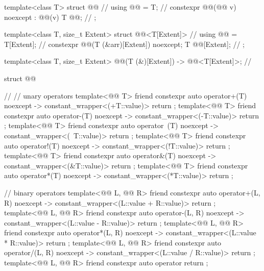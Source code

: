 \begin{codeblock}
template<class T>
struct @@ {                                                         // \expos
  using @@ = T;                                                               // \expos
  constexpr @@(@@ v) noexcept : @@(v) {}
  T @@;                                                                       // \expos
};

template<class T, size_t Extent>
struct @@<T[Extent]> {                                              // \expos
  using @@ = T[Extent];                                                       // \expos
  constexpr @@(T (&arr)[Extent]) noexcept;
  T @@[Extent];                                                               // \expos
};

template<class T, size_t Extent>
  @@(T (&)[Extent]) -> @@<T[Extent]>;                   // \expos

struct @@ {                                                           // \expos
  // unary operators
  template<@@ T>
    friend constexpr auto operator+(T) noexcept -> constant_wrapper<(+T::value)>
      { return {}; }
  template<@@ T>
    friend constexpr auto operator-(T) noexcept -> constant_wrapper<(-T::value)>
      { return {}; }
  template<@@ T>
    friend constexpr auto operator~(T) noexcept -> constant_wrapper<(~T::value)>
      { return {}; }
  template<@@ T>
    friend constexpr auto operator!(T) noexcept -> constant_wrapper<(!T::value)>
      { return {}; }
  template<@@ T>
    friend constexpr auto operator&(T) noexcept -> constant_wrapper<(&T::value)>
      { return {}; }
  template<@@ T>
    friend constexpr auto operator*(T) noexcept -> constant_wrapper<(*T::value)>
      { return {}; }

  // binary operators
  template<@@ L, @@ R>
    friend constexpr auto operator+(L, R) noexcept -> constant_wrapper<(L::value + R::value)>
      { return {}; }
  template<@@ L, @@ R>
    friend constexpr auto operator-(L, R) noexcept -> constant_wrapper<(L::value - R::value)>
      { return {}; }
  template<@@ L, @@ R>
    friend constexpr auto operator*(L, R) noexcept -> constant_wrapper<(L::value * R::value)>
      { return {}; }
  template<@@ L, @@ R>
    friend constexpr auto operator/(L, R) noexcept -> constant_wrapper<(L::value / R::value)>
      { return {}; }
  template<@@ L, @@ R>
    friend constexpr auto operator%
      { return {}; }

}
\end{codeblock}
